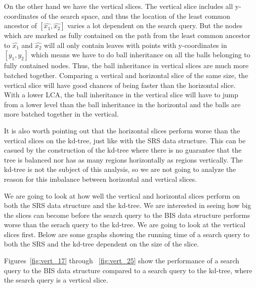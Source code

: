 On the other hand we have the vertical slices. The vertical slice includes all y-coordinates of the search space, and thus the location of the least common ancestor of $[\hat{x_1}, \hat{x_2}]$ varies a lot dependent on the search query. But the nodes which are marked as fully contained on the path from the least common ancestor to $\hat{x_1}$ and $\hat{x_2}$ will all only contain leaves with points with y-coordinates in $[y_1, y_2]$ which means we have to do ball inheritance on all the balls belonging to fully contained nodes. Thus, the ball inheritance in vertical slices are much more batched together. Comparing a vertical and horizontal slice of the same size, the vertical slice will have good chances of being faster than the horizontal slice. With a lower LCA, the ball inheritance in the vertical slice will have to jump from a lower level than the ball inheritance in the horizontal and the balls are more batched together in the vertical. 

It is also worth pointing out that the horizontal slices perform worse than the vertical slices on the kd-tree, just like with the SRS data structure. This can be casued by the construction of the kd-tree where there is no guarantee that the tree is balanced nor has as many regions horizontally as regions vertically. The kd-tree is not the subject of this analysis, so we are not going to analyze the reason for this imbalance between horizontal and vertical slices.

We are going to look at how well the vertical and horizontal slices perform on both the SRS data structure and the kd-tree. We are interested in seeing how big the slices can become before the search query to the BIS data structure performs worse than the serach query to the kd-tree. We are going to look at the vertical slices first. Below are some graphs showing the running time of a search query to both the SRS and the kd-tree dependent on the size of the slice. 

Figures~\ref{fig:vert_17} through ~\ref{fig:vert_25} show the performance of a search query to the BIS data structure compared to a search query to the kd-tree, where the search query is a vertical slice.



